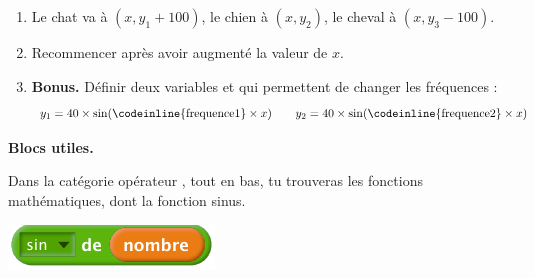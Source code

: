 \documentclass[class=report,crop=false, 12pt]{standalone}
\begin{document}
\begin{activite}
\begin{enumerate}
  \item Le chat va à $(x,y_1+100)$, le chien à $(x,y_2)$, le cheval à $(x,y_3-100)$.
  
  \item Recommencer après avoir augmenté la valeur de $x$.
  
  \item \textbf{Bonus.} Définir deux variables  et  qui permettent de changer les fréquences :
  $$y_1 = 40 \times \sin(\text{\codeinline{frequence1}} \times x)
  \qquad y_2 = 40 \times \sin(\text{\codeinline{frequence2}} \times x)$$ 
  
\end{enumerate}  

\medskip
\textbf{Blocs utiles.}

Dans la catégorie \og opérateur \fg{}, tout en bas, tu trouveras les fonctions mathématiques, dont la fonction \og sinus\fg{}.

\begin{center}
  \includegraphics[scale=\scalebloc]{bloc-09-ex2} 
\end{center}

\end{activite}
\end{document}
